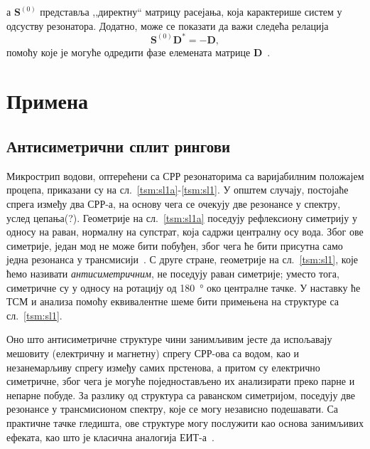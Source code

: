 \documentclass[main.tex]{subfiles}
\begin{document}
а $\mathbf{S}^{(0)}$ представља ,,директну`` матрицу расејања, која карактерише систем у одсуству резонатора. Додатно, може се показати да важи следећа релација
\begin{equation}
\mathbf{S}^{(0)}\mathbf{D^*}=-\mathbf{D},
\label{tsm:haus:d_usl}
\end{equation}
помоћу које је могуће одредити фазе елемената матрице $\mathbf{D}$~\cite{wonjoo}.


\section{Примена}
\subsection{Антисиметрични сплит рингови}%

Микрострип водови, оптерећени са СРР резонаторима са варијабилним положајем процепа, приказани су на сл.~\ref{tsm:sl1a}-\ref{tsm:sl1}. У општем случају, постојаће спрега између два СРР-а, на основу чега се очекују две резонансе у спектру, услед цепања(?). Геометрије на сл.~\ref{tsm:sl1a} поседују рефлексиону симетрију у односу на раван, нормалну на супстрат, која садржи централну осу вода. Због ове симетрије, један мод не може бити побуђен, због чега ће бити присутна само једна резонанса у трансмисији~\cite{radoman}. С друге стране, геометрије на сл.~\ref{tsm:sl1}, које ћемо називати \emph{антисиметричним}, не поседују раван симетрије; уместо тога, симетричне су у односу на ротацију од \SI{180}{\degree} око централне тачке. У наставку ће ТСМ и анализа помоћу еквивалентне шеме бити примењена на структуре са сл.~\ref{tsm:sl1}.

Оно што антисиметричне структуре чини занимљивим јесте да испољавају мешовиту (електричну и магнетну) спрегу СРР-ова са водом, као и незанемарљиву спрегу између самих прстенова, а притом су електрично симетричне, због чега је могуће поједностављено их анализирати преко парне и непарне побуде. За разлику од структура са раванском симетријом, поседују две резонансе у трансмисионом спектру, које се могу независно подешавати. Са практичне тачке гледишта, ове структуре могу послужити као основа занимљивих ефеката, као што је класична аналогија ЕИТ-а~\cite{tassin:09,mr03:eit,cihan}. %
\end{document}
